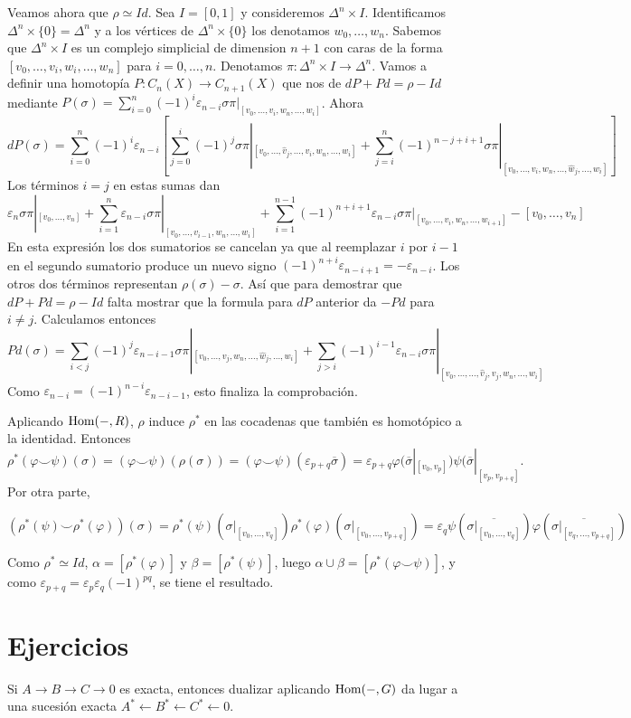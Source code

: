 \documentclass[TA.tex]{subfiles}
\begin{document}
\begin{dem}
Veamos ahora que $\rho\simeq Id$. Sea $I=[0,1]$ y consideremos $\Delta^n\times I$. Identificamos $\Delta^n\times\{0\}=\Delta^n$ y a los vértices de $\Delta^n\times\{0\}$ los denotamos $w_0,\dots, w_n$. Sabemos que $\Delta^n\times I$ es un complejo simplicial de dimension $n+1$ con caras de la forma $[v_0,\dots, v_i,w_i,\dots, w_n]$ para $i=0,\dots, n$. Denotamos $\pi:\Delta^n\times I\to \Delta^n$. Vamos a definir una homotopía $P:C_n(X)\to C_{n+1}(X)$ que nos de $dP+Pd=\rho-Id$ mediante $P(\sigma)=\sum_{i=0}^n(-1)^i\varepsilon_{n-i}\sigma\pi|_{[v_0,\dots, v_i,w_n,\dots,w_i]}$. Ahora
\[
dP(\sigma)=\sum_{i=0}^n(-1)^i\varepsilon_{n-i}\left[\sum_{j=0}^i(-1)^j\sigma\pi|_{[v_0,\dots,\hat{v}_j,\dots,  v_i,w_n,\dots,w_i]}+\sum_{j=i}^n(-1)^{n-j+i+1}\sigma\pi|_{[v_0,\dots, v_i,w_n,\dots,\hat{w}_j,\dots, w_i]}\right]
\]
Los términos $i=j$ en estas sumas dan
\[
\varepsilon_n\sigma\pi|_{[v_0,\dots,v_n]}+\sum_{i=1}^n\varepsilon_{n-i}\sigma\pi|_{[v_0,\dots,v_{i-1},w_n,\dots, w_i]}+\sum_{i=1}^{n-1}(-1)^{n+i+1}\varepsilon_{n-i}\sigma\pi|_{[v_0,\dots, v_i,w_n,\dots, w_{i+1}]}-[v_0,\dots, v_n]
\]
En esta expresión los dos sumatorios se cancelan ya que al reemplazar $i$ por $i-1$ en el segundo sumatorio produce un nuevo signo $(-1)^{n+i}\varepsilon_{n-i+1}=-\varepsilon_{n-i}$. Los otros dos términos representan $\rho(\sigma)-\sigma$. Así que para demostrar que $dP+Pd=\rho-Id$ falta mostrar que la formula para $dP$ anterior da $-Pd$ para $i\neq j$. Calculamos entonces
\[
Pd(\sigma)=\sum_{i<j}(-1)^j\varepsilon_{n-i-1}\sigma\pi|_{[v_0,\dots, v_j,w_n,\dots,\hat{w}_j,\dots,w_i]}+\sum_{j>i}(-1)^{i-1}\varepsilon_{n-i}\sigma\pi|_{[v_0,\dots, \dots,\hat{v}_j,v_j,w_n,\dots,w_i]}
\]
Como $\varepsilon_{n-i}=(-1)^{n-i}\varepsilon_{n-i-1}$, esto finaliza la comprobación.


Aplicando $\operatorname{Hom}(-,R)$, $\rho$ induce $\rho^*$ en las cocadenas que también es homotópico a la identidad. Entonces $$\rho^*(\varphi\smile\psi)(\sigma)=(\varphi\smile\psi)(\rho(\sigma))=(\varphi\smile\psi)(\varepsilon_{p+q}\overline{\sigma})=\varepsilon_{p+q}\varphi(\overline{\sigma}|_{[v_0, v_p]})\psi(\overline{\sigma}|_{[v_p,v_{p+q}]}.$$ 
Por otra parte, 

$$
(\rho^*(\psi)\smile\rho^*(\varphi))(\sigma)=\rho^*(\psi)(\sigma|_{[v_0,\dots, v_q]})\rho^*(\varphi)(\sigma|_{[v_0,\dots,v_{p+q}]})=\varepsilon_q\psi(\overline{\sigma|_{[v_0,\dots, v_q]}})\varphi(\overline{\sigma|_{[v_q, \dots,v_{p+q}]}})
$$

Como $\rho^*\simeq Id$, $\alpha=[\rho^*(\varphi)]$ y $\beta=[\rho^*(\psi)]$, luego $\alpha\cup\beta=[\rho^*(\varphi\smile\psi)]$, y como $\varepsilon_{p+q}=\varepsilon_p\varepsilon_q(-1)^{pq}$, se tiene el resultado. 
\end{dem}
\section{Ejercicios}
\begin{ejer}
Si $A\to B\to C\to 0$ es exacta, entonces dualizar aplicando $\operatorname{Hom}(-,G)$ da lugar a una sucesión exacta $A^*\leftarrow B^*\leftarrow C^*\leftarrow 0$.
\end{ejer}
\end{document}
